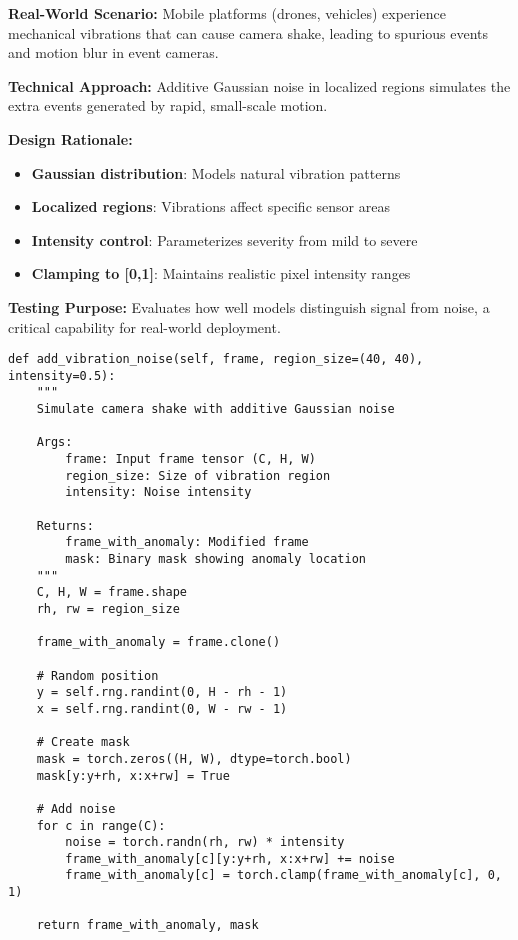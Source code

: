 \documentclass[12pt,a4paper]{article}
\begin{document}
\textbf{Real-World Scenario:} Mobile platforms (drones, vehicles) experience mechanical vibrations that can cause camera shake, leading to spurious events and motion blur in event cameras.

\textbf{Technical Approach:} Additive Gaussian noise in localized regions simulates the extra events generated by rapid, small-scale motion.

\textbf{Design Rationale:}
\begin{itemize}
    \item \textbf{Gaussian distribution}: Models natural vibration patterns
    \item \textbf{Localized regions}: Vibrations affect specific sensor areas
    \item \textbf{Intensity control}: Parameterizes severity from mild to severe
    \item \textbf{Clamping to [0,1]}: Maintains realistic pixel intensity ranges
\end{itemize}

\textbf{Testing Purpose:} Evaluates how well models distinguish signal from noise, a critical capability for real-world deployment.

\begin{lstlisting}[caption={Vibration Noise Implementation - Simulating Mechanical Disturbances}]
def add_vibration_noise(self, frame, region_size=(40, 40), intensity=0.5):
    """
    Simulate camera shake with additive Gaussian noise
    
    Args:
        frame: Input frame tensor (C, H, W)
        region_size: Size of vibration region
        intensity: Noise intensity
    
    Returns:
        frame_with_anomaly: Modified frame
        mask: Binary mask showing anomaly location
    """
    C, H, W = frame.shape
    rh, rw = region_size
    
    frame_with_anomaly = frame.clone()
    
    # Random position
    y = self.rng.randint(0, H - rh - 1)
    x = self.rng.randint(0, W - rw - 1)
    
    # Create mask
    mask = torch.zeros((H, W), dtype=torch.bool)
    mask[y:y+rh, x:x+rw] = True
    
    # Add noise
    for c in range(C):
        noise = torch.randn(rh, rw) * intensity
        frame_with_anomaly[c][y:y+rh, x:x+rw] += noise
        frame_with_anomaly[c] = torch.clamp(frame_with_anomaly[c], 0, 1)
    
    return frame_with_anomaly, mask
\end{lstlisting}
\end{document}
